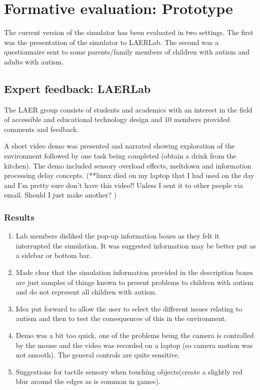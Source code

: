 \chapter{Formative evaluation: Prototype}
The current version of the simulator has been evaluated in two settings. The first was the presentation of the simulator to LAERLab. The second was a questionnaire sent to some parents/family members of children with autism and adults with autism.

\section{Expert feedback: LAERLab}
The LAER group consists of students and academics with an interest in the field of accessible and educational technology design and 10 members provided comments and feedback.

A short video demo was presented and narrated showing exploration of the environment followed by one task being completed (obtain a drink from the kitchen). The demo included sensory overload effects, meltdown and information processing delay concepts. (**linux died on my laptop that I had used on the day and I'm pretty sure don't have this video!! Unless I sent it to other people via email. Should I just make another? )

\subsection{Results}

\begin{enumerate}
\item Lab members disliked the pop-up information boxes as they felt it interrupted the simulation. It was suggested information may be better put as a sidebar or bottom bar.
\item Made clear that the simulation information provided in the description boxes are just samples of things known to present problems to children with autism and do not represent all children with autism.
\item Idea put forward to allow the user to select the different issues relating to autism and then to test the consequences of this in the environment. 
\item Demo was a bit too quick, one of the problems being the camera is controlled by the mouse and the video was recorded on a laptop (so camera motion was not smooth). The general controls are quite sensitive.
\item Suggestions for tactile sensory when touching objects(create a slightly red blur around the edges as is common in games).
\end{enumerate}


